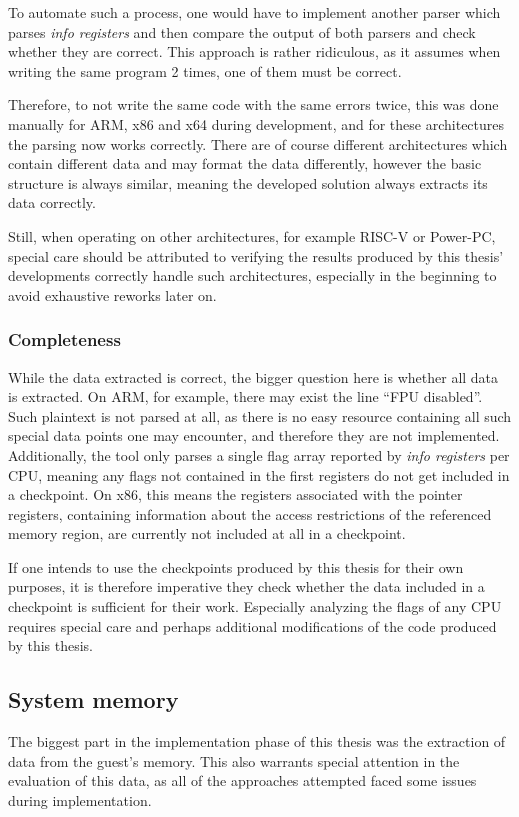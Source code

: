 To automate such a process, one would have to implement another parser which parses \emph{info registers}
and then compare the output of both parsers and check whether they are correct.
This approach is rather ridiculous, as it assumes when writing the same program 2 times,
one of them must be correct.

Therefore, to not write the same code with the same errors twice,
this was done manually for ARM, x86 and x64 during development,
and for these architectures the parsing now works correctly.
There are of course different architectures which contain different data
and may format the data differently, however the basic structure is always similar,
meaning the developed solution always extracts its data correctly.

Still, when operating on other architectures, for example RISC-V or Power-PC,
special care should be attributed to verifying
the results produced by this thesis' developments
correctly handle such architectures, especially in the beginning to avoid exhaustive reworks later on.

\subsubsection*{Completeness}
While the data extracted is correct, the bigger question here is whether all data is extracted.
On ARM, for example, there may exist the line \enquote{FPU disabled}.
Such plaintext is not parsed at all,
as there is no easy resource containing all such special data points one may encounter,
and therefore they are not implemented.
Additionally, the tool only parses a single flag array reported by \emph{info registers} per CPU,
meaning any flags not contained in the first registers do not get included in a checkpoint.
On x86, this means the registers associated with the pointer registers,
containing information about the access restrictions of the referenced memory region,
are currently not included at all in a checkpoint.

If one intends to use the checkpoints produced by this thesis for their own purposes,
it is therefore imperative they check whether the data included in a checkpoint is sufficient for their work.
Especially analyzing the flags of any CPU requires special care
and perhaps additional modifications of the code produced by this thesis.

\subsection{System memory}
The biggest part in the implementation phase of this thesis
was the extraction of data from the guest's memory.
This also warrants special attention in the evaluation of this data,
as all of the approaches attempted faced some issues during implementation.

